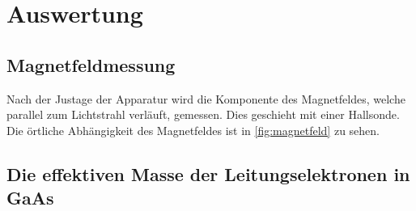 
\section{Auswertung}

\subsection{Magnetfeldmessung}
Nach der Justage der Apparatur wird die Komponente des Magnetfeldes,
welche parallel zum Lichtstrahl verläuft, gemessen.  Dies geschieht mit
einer Hallsonde.  Die örtliche Abhängigkeit des Magnetfeldes ist in
\cref{fig:magnetfeld} zu sehen.

\subsection{Die effektiven Masse der Leitungselektronen in GaAs}
